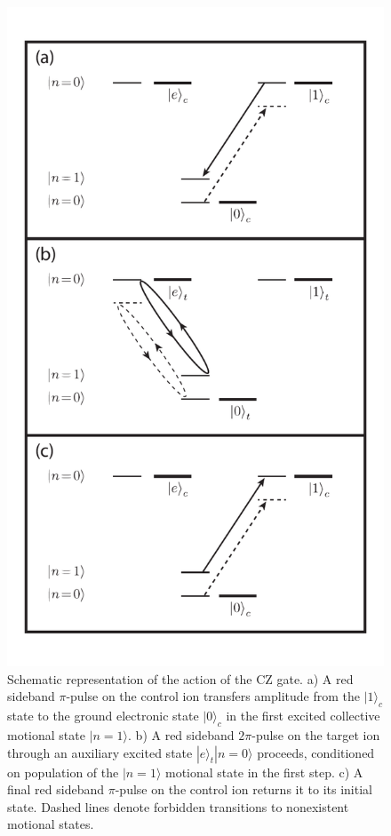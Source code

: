 \documentclass[%
reprint,
 amsmath,amssymb,
]{revtex4-1}
\begin{document}
\begin{figure}
\includegraphics[width=\columnwidth]{CZ_lettered.pdf}
\caption{Schematic representation of the action of the CZ gate.  a) A red sideband $\pi$-pulse on the control ion transfers amplitude from the $|1\rangle_{c}$  state to the ground electronic state $|0\rangle_{c}$ in the first excited collective motional state $|n=1\rangle$. b) A red sideband $2\pi$-pulse on the target ion through an auxiliary excited state $|e\rangle_{t}|n=0\rangle$ proceeds, conditioned on population of the $|n=1\rangle$ motional state in the first step. c) A final red sideband $\pi$-pulse on the control ion returns it to its initial state. Dashed lines denote forbidden transitions to nonexistent motional states.}
\label{CZFigure}
\end{figure}
\end{document}
